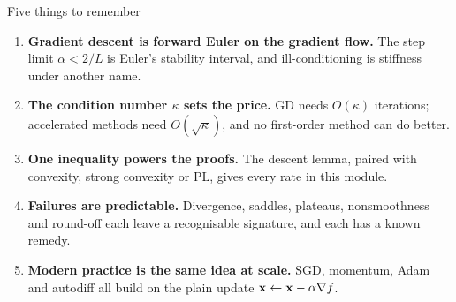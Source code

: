 \begin{frame}{Five things to remember}
  \begin{enumerate}\small
    \item \textbf{Gradient descent is forward Euler on the gradient flow.} The step limit $\alpha<2/L$ is Euler's stability
          interval, and ill-conditioning is stiffness under another name.
    \item \textbf{The condition number $\kappa$ sets the price.} GD needs $O(\kappa)$ iterations; accelerated methods need
          $O(\sqrt\kappa)$, and no first-order method can do better.
    \item \textbf{One inequality powers the proofs.} The descent lemma, paired with convexity, strong convexity or PL,
          gives every rate in this module.
    \item \textbf{Failures are predictable.} Divergence, saddles, plateaus, nonsmoothness and round-off each leave a
          recognisable signature, and each has a known remedy.
    \item \textbf{Modern practice is the same idea at scale.} SGD, momentum, Adam and autodiff all build on the plain update
          $\mathbf{x}\gets\mathbf{x}-\alpha\nabla f$.
  \end{enumerate}
\end{frame}

